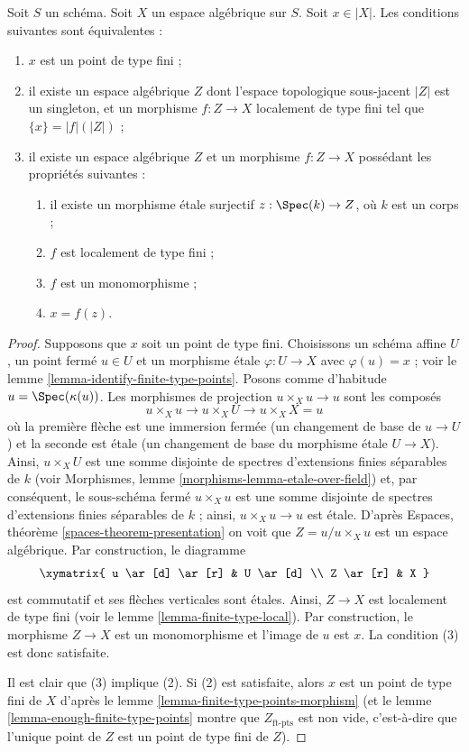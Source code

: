 \begin{lemma}
\label{lemma-point-finite-type-monomorphism}
Soit $S$ un schéma. Soit $X$ un espace algébrique sur $S$.
Soit $x \in |X|$. Les conditions suivantes sont équivalentes :
\begin{enumerate}
\item $x$ est un point de type fini ;
\item il existe un espace algébrique $Z$ dont l'espace topologique sous-jacent
$|Z|$ est un singleton, et un morphisme $f : Z \to X$ localement de type
fini tel que $\{x\} = |f|(|Z|)$ ;
\item il existe un espace algébrique $Z$ et un morphisme $f : Z \to X$
possédant les propriétés suivantes :
\begin{enumerate}
\item il existe un morphisme étale surjectif
$z : \Spec(k) \to Z$, où $k$ est un corps ;
\item $f$ est localement de type fini ;
\item $f$ est un monomorphisme ;
\item $x = f(z)$.
\end{enumerate}
\end{enumerate}
\end{lemma}

\begin{proof}
Supposons que $x$ soit un point de type fini. Choisissons un schéma affine $U$,
un point fermé $u \in U$ et un morphisme étale $\varphi : U \to X$
avec $\varphi(u) = x$ ; voir le
lemme \ref{lemma-identify-finite-type-points}.
Posons comme d'habitude $u = \Spec(\kappa(u))$. Les morphismes de projection
$u \times_X u \to u$ sont les composés
$$
u \times_X u \to u \times_X U \to u \times_X X = u
$$
où la première flèche est une immersion fermée (un changement de base de
$u \to U$) et la seconde est étale (un changement de base du morphisme étale
$U \to X$). Ainsi, $u \times_X U$ est une somme disjointe de spectres
d'extensions finies séparables de $k$ (voir
Morphismes, lemme \ref{morphisms-lemma-etale-over-field})
et, par conséquent, le sous-schéma fermé $u \times_X u$ est une somme disjointe de
spectres d'extensions finies séparables de $k$ ; ainsi, $u \times_X u \to u$ est étale. D'après
Espaces, théorème \ref{spaces-theorem-presentation}
on voit que $Z = u/u \times_X u$ est un espace algébrique. Par construction,
le diagramme
$$
\xymatrix{
u \ar[d] \ar[r] & U \ar[d] \\
Z \ar[r] & X
}
$$
est commutatif et ses flèches verticales sont étales. Ainsi, $Z \to X$ est localement
de type fini (voir le
lemme \ref{lemma-finite-type-local}).
Par construction, le morphisme $Z \to X$ est un monomorphisme et
l'image de $u$ est $x$. La condition (3) est donc satisfaite.

\medskip\noindent
Il est clair que (3) implique (2).
Si (2) est satisfaite, alors $x$ est un point de type fini de $X$ d'après le
lemme \ref{lemma-finite-type-points-morphism}
(et le
lemme \ref{lemma-enough-finite-type-points}
montre que $Z_{\text{ft-pts}}$ est non vide, c'est-à-dire que l'unique point de
$Z$ est un point de type fini de $Z$).
\end{proof}





